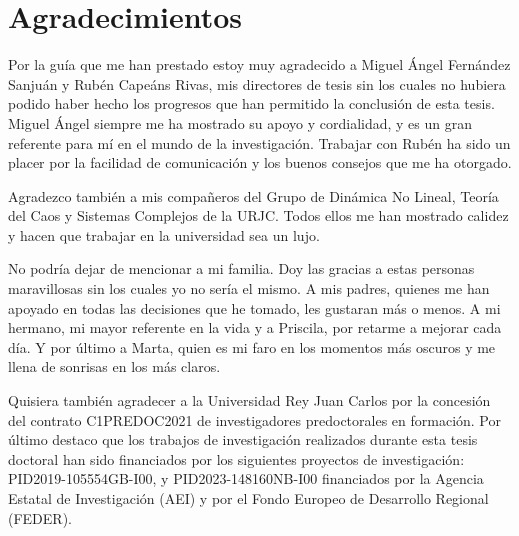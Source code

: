 \chapter*{Agradecimientos}

Por la guía que me han prestado estoy muy agradecido a Miguel Ángel Fernández Sanjuán y Rubén Capeáns Rivas, mis directores de tesis sin los cuales no hubiera podido haber hecho los progresos que han permitido la conclusión de esta tesis. Miguel Ángel siempre me ha mostrado su apoyo y cordialidad, y es un gran referente para mí en el mundo de la investigación. Trabajar con Rubén ha sido un placer por la facilidad de comunicación y los buenos consejos que me ha otorgado.


Agradezco también a mis compañeros del Grupo de Dinámica No Lineal, Teoría del Caos y Sistemas Complejos de la URJC. Todos ellos me han mostrado calidez y hacen que trabajar en la universidad sea un lujo.


No podría dejar de mencionar a mi familia. Doy las gracias a estas personas maravillosas sin los cuales yo no sería el mismo. A mis padres, quienes me han apoyado en todas las decisiones que he tomado, les gustaran más o menos. A mi hermano, mi mayor referente en la vida y a Priscila, por retarme a mejorar cada día. Y por último a Marta, quien es mi faro en los momentos más oscuros y me llena de sonrisas en los más claros.


Quisiera también agradecer a la Universidad Rey Juan Carlos por la concesión del contrato C1PREDOC2021 de investigadores predoctorales en formación. Por último destaco que los trabajos de investigación realizados durante esta tesis doctoral han sido financiados por los siguientes proyectos de investigación: PID2019-105554GB-I00, y PID2023-148160NB-I00 financiados por la Agencia Estatal de Investigación (AEI) y por el Fondo Europeo de Desarrollo Regional (FEDER).